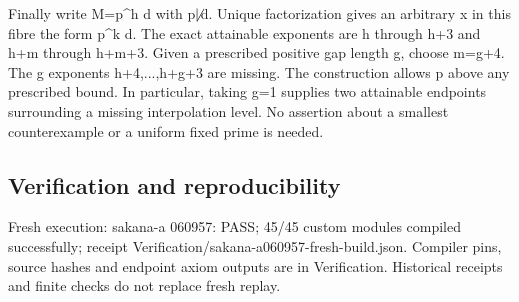 \documentclass[11pt,a4paper]{article}
\begin{document}
Finally write M=p\textasciicircum{}h d with p\ensuremath{\not\mid}d. Unique factorization gives an arbitrary x in this fibre the form p\textasciicircum{}k d. The exact attainable exponents are h through h+3 and h+m through h+m+3. Given a prescribed positive gap length g, choose m=g+4. The g exponents h+4,...,h+g+3 are missing. The construction allows p above any prescribed bound. In particular, taking g=1 supplies two attainable endpoints surrounding a missing interpolation level. No assertion about a smallest counterexample or a uniform fixed prime is needed.

\subsection{Verification and reproducibility}
Fresh execution: sakana-a 060957: PASS; 45/45 custom modules compiled successfully; receipt Verification/sakana-a060957-fresh-build.json. Compiler pins, source hashes and endpoint axiom outputs are in Verification. Historical receipts and finite checks do not replace fresh replay.
\end{document}
